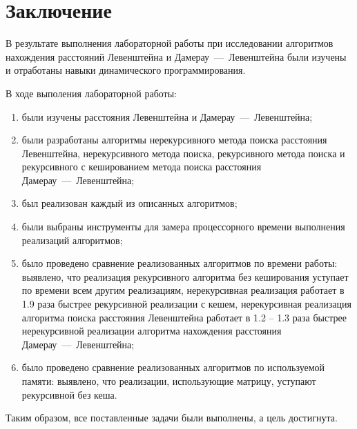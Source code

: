 \chapter*{Заключение}

В результате выполнения лабораторной работы при исследовании алгоритмов нахождения расстояний Левенштейна и Дамерау~---~Левенштейна были изучены и отработаны навыки динамического программирования.

В ходе выполения лабораторной работы:

\begin{enumerate}[label={\arabic*)}]
    \item были изучены расстояния Левенштейна и Дамерау~---~Левенштейна;
    \item были разработаны алгоритмы нерекурсивного метода поиска расстояния Левенштейна, нерекурсивного метода поиска, рекурсивного метода поиска и рекурсивного с кешированием метода поиска расстояния Дамерау~---~Левенштейна;
    \item был реализован каждый из описанных алгоритмов;
    \item были выбраны инструменты для замера процессорного времени выполнения реализаций алгоритмов;
    \item было проведено сравнение реализованных алгоритмов по времени работы:
  	выявлено, что реализация рекурсивного алгоритма без кеширования уступает по времени всем другим реализациям, нерекурсивная реализация работает в 1.9 раза быстрее рекурсивной реализации с кешем, нерекурсивная реализация алгоритма поиска расстояния Левенштейна работает в 1.2 -- 1.3 раза быстрее нерекурсивной реализации алгоритма нахождения расстояния Дамерау~---~Левенштейна;
    \item было проведено сравнение реализованных алгоритмов по используемой памяти: выявлено, что реализации, использующие матрицу, уступают рекурсивной без кеша.
\end{enumerate}

Таким образом, все поставленные задачи были выполнены, а цель достигнута.
